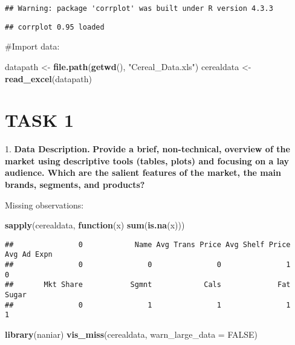 \documentclass[
]{article}
\newenvironment{Shaded}{\begin{snugshade}}{\end{snugshade}}
\newcommand{\AttributeTok}[1]{\textcolor[rgb]{0.13,0.29,0.53}{#1}}
\newcommand{\ConstantTok}[1]{\textcolor[rgb]{0.56,0.35,0.01}{#1}}
\newcommand{\ControlFlowTok}[1]{\textcolor[rgb]{0.13,0.29,0.53}{\textbf{#1}}}
\newcommand{\FunctionTok}[1]{\textcolor[rgb]{0.13,0.29,0.53}{\textbf{#1}}}
\newcommand{\NormalTok}[1]{#1}
\newcommand{\OtherTok}[1]{\textcolor[rgb]{0.56,0.35,0.01}{#1}}
\newcommand{\StringTok}[1]{\textcolor[rgb]{0.31,0.60,0.02}{#1}}
\begin{document}
\begin{verbatim}
## Warning: package 'corrplot' was built under R version 4.3.3
\end{verbatim}

\begin{verbatim}
## corrplot 0.95 loaded
\end{verbatim}

\#Import data:

\begin{Shaded}
\begin{Highlighting}[]
\NormalTok{datapath }\OtherTok{\textless{}{-}} \FunctionTok{file.path}\NormalTok{(}\FunctionTok{getwd}\NormalTok{(), }\StringTok{"Cereal\_Data.xls"}\NormalTok{) }
\NormalTok{cerealdata }\OtherTok{\textless{}{-}} \FunctionTok{read\_excel}\NormalTok{(datapath)}
\end{Highlighting}
\end{Shaded}

\section{TASK 1}\label{task-1}

1. \textbf{Data Description.} \textbf{Provide a brief, non-technical,
overview of the market using descriptive tools (tables, plots) and
focusing on a lay audience. Which are the salient features of the
market, the main brands, segments, and products?}

Missing observations:

\begin{Shaded}
\begin{Highlighting}[]
\FunctionTok{sapply}\NormalTok{(cerealdata, }\ControlFlowTok{function}\NormalTok{(x) }\FunctionTok{sum}\NormalTok{(}\FunctionTok{is.na}\NormalTok{(x)))}
\end{Highlighting}
\end{Shaded}

\begin{verbatim}
##               0            Name Avg Trans Price Avg Shelf Price     Avg Ad Expn 
##               0               0               0               1               0 
##       Mkt Share           Sgmnt            Cals             Fat           Sugar 
##               0               1               1               1               1
\end{verbatim}

\begin{Shaded}
\begin{Highlighting}[]
\FunctionTok{library}\NormalTok{(naniar)}
\FunctionTok{vis\_miss}\NormalTok{(cerealdata, }\AttributeTok{warn\_large\_data =} \ConstantTok{FALSE}\NormalTok{)}
\end{Highlighting}
\end{Shaded}
\end{document}
